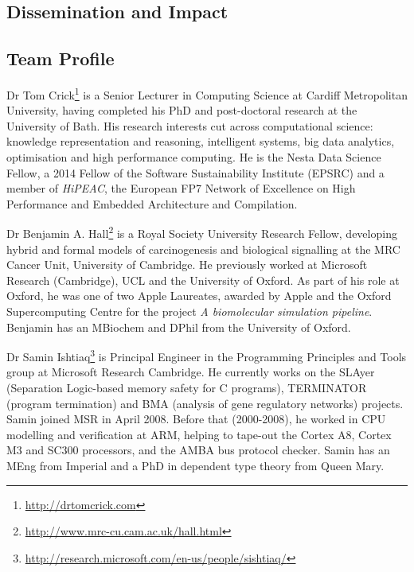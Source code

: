 \documentclass[a4paper,11pt]{article}
\begin{document}
\subsection*{Dissemination and Impact}

\subsection*{Team Profile}

Dr Tom Crick\footnote{\url{http://drtomcrick.com}} is a Senior Lecturer in
Computing Science at Cardiff Metropolitan University, having completed
his PhD and post-doctoral research at the University of Bath. His
research interests cut across computational science: knowledge
representation and reasoning, intelligent systems, big data analytics,
optimisation and high performance computing.  He is the Nesta Data
Science Fellow, a 2014 Fellow of the Software Sustainability Institute
(EPSRC) and a member of {\emph{HiPEAC}}, the European FP7 Network of
Excellence on High Performance and Embedded Architecture and
Compilation.

Dr Benjamin A. Hall\footnote{\url{http://www.mrc-cu.cam.ac.uk/hall.html}}
is a Royal Society University Research Fellow, developing hybrid and
formal models of carcinogenesis and biological signalling at the MRC
Cancer Unit, University of Cambridge. He previously worked at
Microsoft Research (Cambridge), UCL and the University of Oxford. As
part of his role at Oxford, he was one of two Apple
Laureates, awarded by Apple and the Oxford Supercomputing Centre for
the project {\emph{A biomolecular simulation pipeline}}. Benjamin has an
MBiochem and DPhil from the University of Oxford.

Dr Samin
Ishtiaq\footnote{\url{http://research.microsoft.com/en-us/people/sishtiaq/}}
is Principal Engineer in the Programming Principles and Tools group at
Microsoft Research Cambridge. He currently works on the SLAyer
(Separation Logic-based memory safety for C programs), TERMINATOR
(program termination) and BMA (analysis of gene regulatory networks)
projects. Samin joined MSR in April 2008. Before that (2000-2008), he
worked in CPU modelling and verification at ARM, helping to tape-out
the Cortex A8, Cortex M3 and SC300 processors, and the AMBA bus
protocol checker. Samin has an MEng from Imperial and a PhD in
dependent type theory from Queen Mary.



\end{document}
